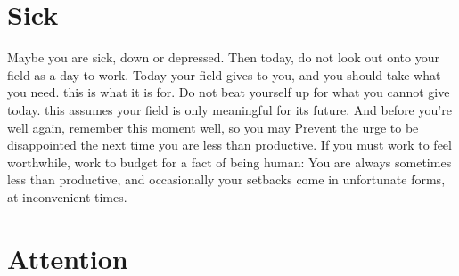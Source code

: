 \documentclass[
]{book}
\begin{document}
\hypertarget{sick}{%
\section{Sick}\label{sick}}

Maybe you are sick, down or depressed.
Then today, do not look out onto your field as a day to work.
Today your field gives to you, and you should take what you need. this is what it is for.
Do not beat yourself up for what you cannot give today. this assumes your field is only meaningful for its future.
And before you're well again, remember this moment well, so you may
Prevent the urge to be disappointed the next time you are less than productive.
If you must work to feel worthwhile, work to budget for a fact of being human:
You are always sometimes less than productive, and occasionally your setbacks come in unfortunate forms, at inconvenient times.

\hypertarget{attention}{%
\section{Attention}\label{attention}}
\end{document}
